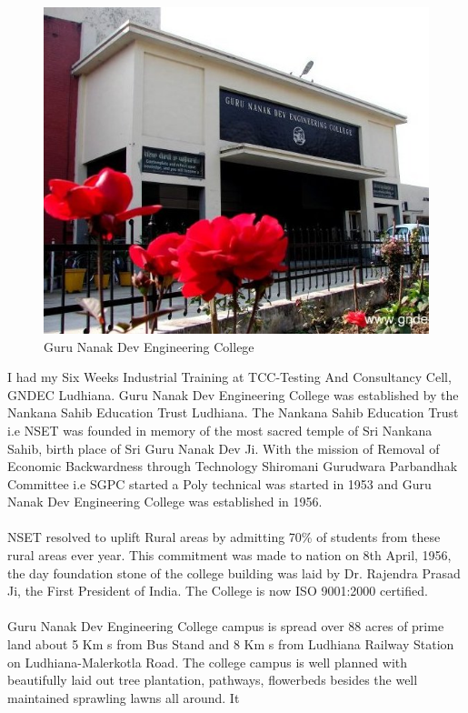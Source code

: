 \begin{figure}[ht]
\centering
\includegraphics[scale=0.7]{images/gndec.jpg}
\caption{Guru Nanak Dev Engineering College}
\end{figure}
\hspace{-1.7em} I had my Six Weeks Industrial Training at TCC-Testing And Consultancy Cell, GNDEC Ludhiana. Guru Nanak Dev Engineering College was established by the Nankana
Sahib Education Trust Ludhiana. The Nankana Sahib Education Trust i.e NSET
was founded in memory of the most sacred temple of Sri Nankana Sahib, birth place
of Sri Guru Nanak Dev Ji. With the mission of Removal of Economic Backwardness
through Technology Shiromani Gurudwara Parbandhak Committee i.e SGPC started a
Poly technical was started in 1953 and Guru Nanak Dev Engineering College was established in 1956.\\\\
NSET resolved to uplift Rural areas by admitting 70\% 
of students from these rural
areas ever year. This commitment was made to nation on 8th April, 1956, the day
foundation stone of the college building was laid by Dr. Rajendra Prasad Ji, the First
President of India. The College is now ISO 9001:2000 certified.\\\\
Guru Nanak Dev Engineering College campus is spread over 88 acres of prime land
about 5 Km s from Bus Stand and 8 Km s from Ludhiana Railway Station on Ludhiana-Malerkotla Road. The college campus is well planned with beautifully laid out tree plantation, pathways, flowerbeds besides the well maintained sprawling lawns all around. It
